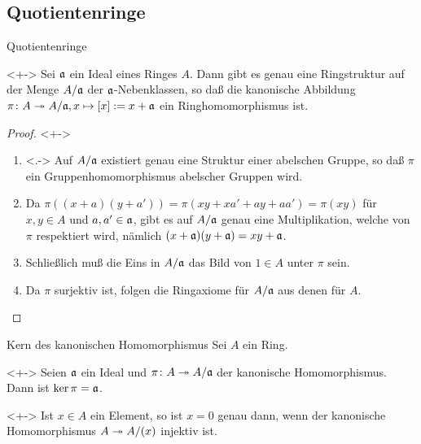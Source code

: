 \subsection{Quotientenringe}

\begin{frame}{Quotientenringe}
    \begin{proposition}<+->
        Sei \(\mathfrak{a}\) ein Ideal eines Ringes \(A\). Dann gibt es genau eine
        Ringstruktur auf der Menge \(A/\mathfrak{a}\) der
        \(\mathfrak{a}\)\nobreakdash-Nebenklassen,
        so daß die kanonische Abbildung \(\pi\colon A \twoheadrightarrow
        A/\mathfrak{a}, x \mapsto [x] := x + \mathfrak{a}\) ein Ringhomomorphismus ist.
    \end{proposition}
    \begin{proof}<+->
        \begin{enumerate}[<+->]
        \item<.->
            Auf \(A/\mathfrak{a}\) existiert genau eine Struktur einer abelschen
            Gruppe, so daß \(\pi\) ein Gruppenhomomorphismus abelscher Gruppen
            wird.
        \item
            Da \(\pi((x + a) (y + a')) = \pi(x y + x a' + a y + a a')
            = \pi(x y)\) für \(x, y \in A\) und
            \(a, a' \in \mathfrak{a}\), gibt es auf \(A/\mathfrak{a}\) genau eine
            Multiplikation, welche von \(\pi\) respektiert wird,
            nämlich \((x + \mathfrak{a}) (y + \mathfrak{a}) = xy + \mathfrak{a}\).
        \item
            Schließlich muß die Eins in \(A/\mathfrak{a}\) das Bild von \(1 \in A\)
            unter \(\pi\) sein.
        \item
            Da \(\pi\) surjektiv ist, folgen die Ringaxiome für \(A/\mathfrak{a}\)
            aus denen für \(A\).
            \qedhere
        \end{enumerate} 
    \end{proof}
\end{frame}

\begin{frame}{Kern des kanonischen Homomorphismus}
	Sei \(A\) ein Ring.
	\begin{example}<+->
		Seien \(\mathfrak{a}\) ein Ideal und \(\pi\colon
		A \twoheadrightarrow A/\mathfrak{a}\) der kanonische Homomorphismus. Dann ist
		\(\ker \pi = \mathfrak{a}\).
	\end{example}
	\begin{example}<+->
		Ist \(x \in A\) ein Element, so ist \(x = 0\) genau dann, wenn der
		kanonische Homomorphismus \(A \twoheadrightarrow A/(x)\) injektiv ist.
	\end{example}
\end{frame}

